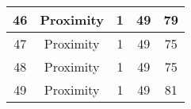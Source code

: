 \documentclass[results.tex]{subfiles}
\begin{document}
\begin{center}
\begin{tabular}{| c || c | c | c | c |}
            \hline
            46                      & Proximity                    & 1                      & 49                      & 79                   \\
            \hline
            47                      & Proximity                    & 1                      & 49                      & 75                   \\
            \hline
            48                      & Proximity                    & 1                      & 49                      & 75                   \\
            \hline
            49                      & Proximity                    & 1                      & 49                      & 81                   \\
            \hline
        \end{tabular}
    \end{center}
\end{document}
